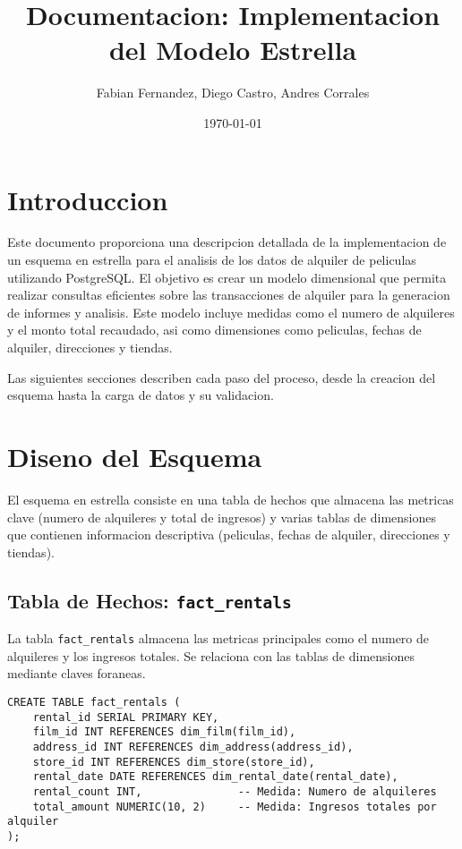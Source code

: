 \documentclass{article}
\title{Documentacion: Implementacion del Modelo Estrella}
\author{Fabian Fernandez, Diego Castro, Andres Corrales}
\date{\today}
\begin{document}
\maketitle

\section{Introduccion}

Este documento proporciona una descripcion detallada de la implementacion de un esquema en estrella para el analisis de los datos de alquiler de peliculas utilizando PostgreSQL. El objetivo es crear un modelo dimensional que permita realizar consultas eficientes sobre las transacciones de alquiler para la generacion de informes y analisis. Este modelo incluye medidas como el numero de alquileres y el monto total recaudado, asi como dimensiones como peliculas, fechas de alquiler, direcciones y tiendas.

Las siguientes secciones describen cada paso del proceso, desde la creacion del esquema hasta la carga de datos y su validacion.

\section{Diseno del Esquema}

El esquema en estrella consiste en una tabla de hechos que almacena las metricas clave (numero de alquileres y total de ingresos) y varias tablas de dimensiones que contienen informacion descriptiva (peliculas, fechas de alquiler, direcciones y tiendas).

\subsection{Tabla de Hechos: \texttt{fact\_rentals}}

La tabla \texttt{fact\_rentals} almacena las metricas principales como el numero de alquileres y los ingresos totales. Se relaciona con las tablas de dimensiones mediante claves foraneas.

\begin{lstlisting}
CREATE TABLE fact_rentals (
    rental_id SERIAL PRIMARY KEY,
    film_id INT REFERENCES dim_film(film_id),
    address_id INT REFERENCES dim_address(address_id),
    store_id INT REFERENCES dim_store(store_id),
    rental_date DATE REFERENCES dim_rental_date(rental_date),
    rental_count INT,               -- Medida: Numero de alquileres
    total_amount NUMERIC(10, 2)     -- Medida: Ingresos totales por alquiler
);
\end{lstlisting}
\end{document}

